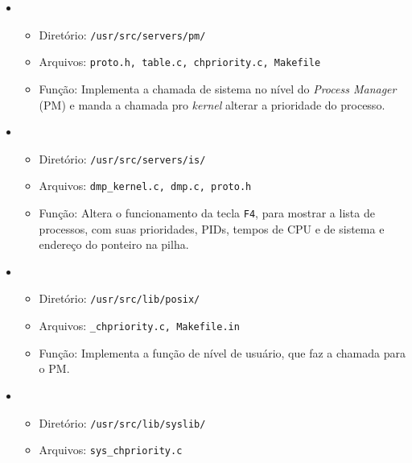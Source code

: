 \documentclass[12pt, a4paper]{article}
\begin{document}
\begin{itemize}

\item \begin{itemize}

\item Diretório: \texttt{/usr/src/servers/pm/}

\item Arquivos: \texttt{proto.h, table.c, chpriority.c, Makefile}

\item Função: Implementa a chamada de sistema no nível do \textit{Process Manager} (PM) e manda a chamada pro \textit{kernel} alterar a prioridade do processo.

\end{itemize}

\item \begin{itemize}

\item Diretório: \texttt{/usr/src/servers/is/}

\item Arquivos: \texttt{dmp{\_}kernel.c, dmp.c, proto.h}

\item Função: Altera o funcionamento da tecla \texttt{F4}, para mostrar a lista de processos, com suas prioridades, PIDs, tempos de CPU e de sistema e endereço do ponteiro na pilha.

\end{itemize}

\item \begin{itemize}

\item Diretório: \texttt{/usr/src/lib/posix/}

\item Arquivos: \texttt{{\_}chpriority.c, Makefile.in}

\item Função: Implementa a função de nível de usuário, que faz a chamada para o PM.

\end{itemize}

\item \begin{itemize}

\item Diretório: \texttt{/usr/src/lib/syslib/}

\item Arquivos: \texttt{sys{\_}chpriority.c}


\end{itemize}
\end{itemize}
\end{document}
